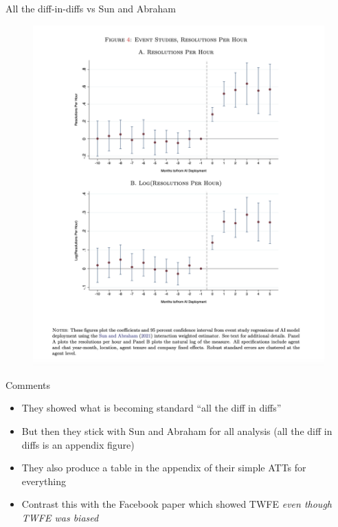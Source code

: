 \documentclass{beamer}
\begin{document}
\begin{frame}{All the diff-in-diffs vs Sun and Abraham}
\begin{multicols}{2}
\begin{figure}
\includegraphics[scale=0.22]{./lecture_includes/brynn3}
\end{figure}

\end{multicols}
\end{frame}

\begin{frame}{Comments}

\begin{itemize}

\item They showed what is becoming standard ``all the diff in diffs''
\item But then they stick with Sun and Abraham for all analysis (all the diff in diffs is an appendix figure)
\item They also produce a table in the appendix of their simple ATTs for everything
\item Contrast this with the Facebook paper which showed TWFE \emph{even though TWFE was biased}

\end{itemize}

\end{frame}
\end{document}
